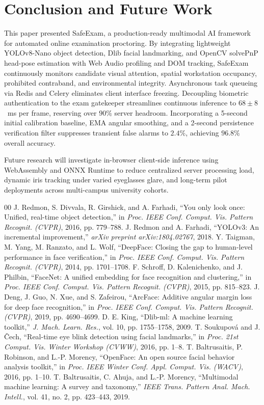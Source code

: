 \documentclass[conference]{IEEEtran}
\begin{document}
\section{Conclusion and Future Work}
This paper presented SafeExam, a production-ready multimodal AI framework for automated online examination proctoring. By integrating lightweight YOLOv8-Nano object detection, Dlib facial landmarking, and OpenCV solvePnP head-pose estimation with Web Audio profiling and DOM tracking, SafeExam continuously monitors candidate visual attention, spatial workstation occupancy, prohibited contraband, and environmental integrity. Asynchronous task queueing via Redis and Celery eliminates client interface freezing. Decoupling biometric authentication to the exam gatekeeper streamlines continuous inference to $68 \pm 8$~ms per frame, reserving over $90\%$ server headroom. Incorporating a 5-second initial calibration baseline, EMA angular smoothing, and a 2-second persistence verification filter suppresses transient false alarms to $2.4\%$, achieving $96.8\%$ overall accuracy.

Future research will investigate in-browser client-side inference using WebAssembly and ONNX Runtime to reduce centralized server processing load, dynamic iris tracking under varied eyeglasses glare, and long-term pilot deployments across multi-campus university cohorts.

\begin{thebibliography}{00}
 J. Redmon, S. Divvala, R. Girshick, and A. Farhadi, ``You only look once: Unified, real-time object detection,'' in \textit{Proc. IEEE Conf. Comput. Vis. Pattern Recognit. (CVPR)}, 2016, pp. 779--788.
 J. Redmon and A. Farhadi, ``YOLOv3: An incremental improvement,'' \textit{arXiv preprint arXiv:1804.02767}, 2018.
 Y. Taigman, M. Yang, M. Ranzato, and L. Wolf, ``DeepFace: Closing the gap to human-level performance in face verification,'' in \textit{Proc. IEEE Conf. Comput. Vis. Pattern Recognit. (CVPR)}, 2014, pp. 1701--1708.
 F. Schroff, D. Kalenichenko, and J. Philbin, ``FaceNet: A unified embedding for face recognition and clustering,'' in \textit{Proc. IEEE Conf. Comput. Vis. Pattern Recognit. (CVPR)}, 2015, pp. 815--823.
 J. Deng, J. Guo, N. Xue, and S. Zafeirou, ``ArcFace: Additive angular margin loss for deep face recognition,'' in \textit{Proc. IEEE Conf. Comput. Vis. Pattern Recognit. (CVPR)}, 2019, pp. 4690--4699.
 D. E. King, ``Dlib-ml: A machine learning toolkit,'' \textit{J. Mach. Learn. Res.}, vol. 10, pp. 1755--1758, 2009.
 T. Soukupov{\'a} and J. {\v{C}}ech, ``Real-time eye blink detection using facial landmarks,'' in \textit{Proc. 21st Comput. Vis. Winter Workshop (CVWW)}, 2016, pp. 1--8.
 T. Baltrusaitis, P. Robinson, and L.-P. Morency, ``OpenFace: An open source facial behavior analysis toolkit,'' in \textit{Proc. IEEE Winter Conf. Appl. Comput. Vis. (WACV)}, 2016, pp. 1--10.
 T. Baltrusaitis, C. Ahuja, and L.-P. Morency, ``Multimodal machine learning: A survey and taxonomy,'' \textit{IEEE Trans. Pattern Anal. Mach. Intell.}, vol. 41, no. 2, pp. 423--443, 2019.
\end{thebibliography}
\end{document}
